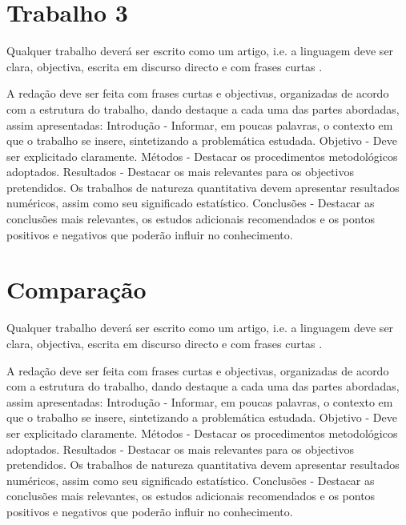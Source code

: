 
\section{Trabalho 3}
Qualquer trabalho deverá ser escrito como um artigo, i.e. a linguagem deve ser clara, objectiva, escrita em discurso directo e com frases curtas \cite{gustavii2016write, glasman2010science}.

A redação deve ser feita com frases curtas e objectivas, organizadas de acordo com a estrutura do trabalho, dando destaque a cada uma das partes abordadas, assim apresentadas: Introdução - Informar, em poucas palavras, o contexto em que o trabalho se insere, sintetizando a problemática estudada. Objetivo - Deve ser explicitado claramente. Métodos - Destacar os procedimentos metodológicos adoptados. Resultados - Destacar os mais relevantes para os objectivos pretendidos. Os trabalhos de natureza quantitativa devem apresentar resultados numéricos, assim como seu significado estatístico. Conclusões - Destacar as conclusões mais relevantes, os estudos adicionais recomendados e os pontos positivos e negativos que poderão influir no conhecimento.


\section{Comparação}
Qualquer trabalho deverá ser escrito como um artigo, i.e. a linguagem deve ser clara, objectiva, escrita em discurso directo e com frases curtas \cite{gustavii2016write, glasman2010science}.

A redação deve ser feita com frases curtas e objectivas, organizadas de acordo com a estrutura do trabalho, dando destaque a cada uma das partes abordadas, assim apresentadas: Introdução - Informar, em poucas palavras, o contexto em que o trabalho se insere, sintetizando a problemática estudada. Objetivo - Deve ser explicitado claramente. Métodos - Destacar os procedimentos metodológicos adoptados. Resultados - Destacar os mais relevantes para os objectivos pretendidos. Os trabalhos de natureza quantitativa devem apresentar resultados numéricos, assim como seu significado estatístico. Conclusões - Destacar as conclusões mais relevantes, os estudos adicionais recomendados e os pontos positivos e negativos que poderão influir no conhecimento.

